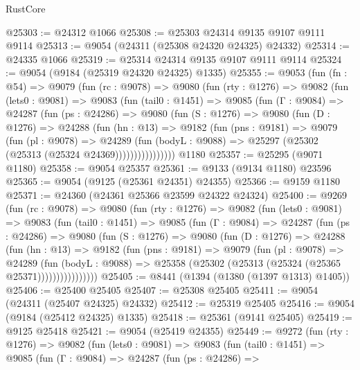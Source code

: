 \begin{lexlean}{RustCore}
\begin{coremodule}
@25303 := @24312 @1066
@25308 := @25303 @24314 @9135 @9107 @9111 @9114
@25313 := @9054 (@24311 (@25308 @24320 @24325) @24332)
@25314 := @24335 @1066
@25319 := @25314 @24314 @9135 @9107 @9111 @9114
@25324 := @9054 (@9184 (@25319 @24320 @24325) @1335)
@25355 := @9053
    (fun (fn : @54) =>
    @9079
      (fun (rc : @9078) =>
      @9080
        (fun (rty : @1276) =>
        @9082
          (fun (lets0 : @9081) =>
          @9083
            (fun (tail0 : @1451) =>
            @9085
              (fun (Γ : @9084) =>
              @24287
                (fun (ps : @24286) =>
                @9080
                  (fun (S : @1276) =>
                  @9080
                    (fun (D : @1276) =>
                    @24288
                      (fun (hn : @13) =>
                      @9182
                        (fun (pns : @9181) =>
                        @9079
                          (fun (pl : @9078) =>
                          @24289
                            (fun (bodyL : @9088) =>
                            @25297 (@25302 (@25313 (@25324 @24369))))))))))))))))
    @1180
@25357 := @25295 (@9071 @1180)
@25358 := @9054 @25357
@25361 := @9133 (@9134 @1180) @23596
@25365 := @9054 (@9125 (@25361 @24351) @24355)
@25366 := @9159 @1180
@25371 := @24360 (@24361 @25366 @23599 @24322 @24324)
@25400 := @9269
    (fun (rc : @9078) =>
    @9080
      (fun (rty : @1276) =>
      @9082
        (fun (lets0 : @9081) =>
        @9083
          (fun (tail0 : @1451) =>
          @9085
            (fun (Γ : @9084) =>
            @24287
              (fun (ps : @24286) =>
              @9080
                (fun (S : @1276) =>
                @9080
                  (fun (D : @1276) =>
                  @24288
                    (fun (hn : @13) =>
                    @9182
                      (fun (pns : @9181) =>
                      @9079
                        (fun (pl : @9078) =>
                        @24289
                          (fun (bodyL : @9088) =>
                          @25358 (@25302 (@25313 (@25324 (@25365 @25371))))))))))))))))
@25405 := @8441 (@1394 (@1380 (@1397 @1313) @1405))
@25406 := @25400 @25405
@25407 := @25308 @25405
@25411 := @9054 (@24311 (@25407 @24325) @24332)
@25412 := @25319 @25405
@25416 := @9054 (@9184 (@25412 @24325) @1335)
@25418 := @25361 (@9141 @25405)
@25419 := @9125 @25418
@25421 := @9054 (@25419 @24355)
@25449 := @9272
    (fun (rty : @1276) =>
    @9082
      (fun (lets0 : @9081) =>
      @9083
        (fun (tail0 : @1451) =>
        @9085
          (fun (Γ : @9084) =>
          @24287
            (fun (ps : @24286) =>

\end{coremodule}
\end{lexlean}
